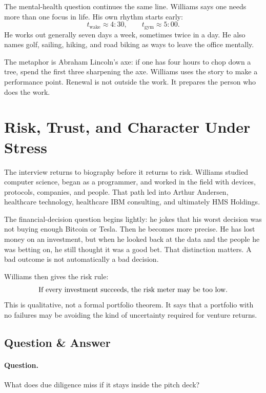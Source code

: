 The mental-health question continues the same line. Williams says one needs more than one focus in life. His own rhythm starts early:
\begin{equation}
t_{\mathrm{wake}} \approx 4{:}30,
\qquad
t_{\mathrm{gym}} \approx 5{:}00.
\end{equation}
He works out generally seven days a week, sometimes twice in a day. He also names golf, sailing, hiking, and road biking as ways to leave the office mentally.

The metaphor is Abraham Lincoln's axe: if one has four hours to chop down a tree, spend the first three sharpening the axe. Williams uses the story to make a performance point. Renewal is not outside the work. It prepares the person who does the work.

\section{Risk, Trust, and Character Under Stress}

The interview returns to biography before it returns to risk. Williams studied computer science, began as a programmer, and worked in the field with devices, protocols, companies, and people. That path led into Arthur Andersen, healthcare technology, healthcare IBM consulting, and ultimately HMS Holdings.

The financial-decision question begins lightly: he jokes that his worst decision was not buying enough Bitcoin or Tesla. Then he becomes more precise. He has lost money on an investment, but when he looked back at the data and the people he was betting on, he still thought it was a good bet. That distinction matters. A bad outcome is not automatically a bad decision.

Williams then gives the risk rule:
\begin{equation}
\hbox{If every investment succeeds, the risk meter may be too low.}
\end{equation}
This is qualitative, not a formal portfolio theorem. It says that a portfolio with no failures may be avoiding the kind of uncertainty required for venture returns.

\subsection{Question \& Answer}

\paragraph{Question.} What does due diligence miss if it stays inside the pitch deck?


